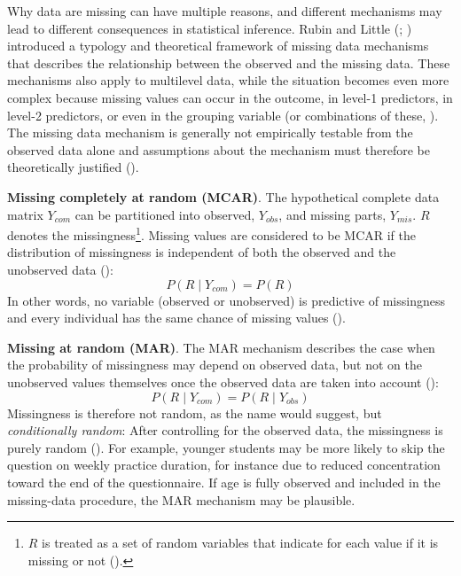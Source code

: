 \documentclass[
  letterpaper,
  11pt,
  english,
  singlespacing,
  headsepline,
  openany]{MastersDoctoralThesis}
\begin{document}
Why data are missing can have multiple reasons, and different mechanisms
may lead to different consequences in statistical inference. Rubin and
Little (;
) introduced a typology and
theoretical framework of missing data mechanisms that describes the
relationship between the observed and the missing data. These mechanisms
also apply to multilevel data, while the situation becomes even more
complex because missing values can occur in the outcome, in level-1
predictors, in level-2 predictors, or even in the grouping variable (or
combinations of these, ). The
missing data mechanism is generally not empirically testable from the
observed data alone and assumptions about the mechanism must therefore
be theoretically justified ().

\textbf{Missing completely at random (MCAR)}. The hypothetical complete
data matrix \(Y_{com}\) can be partitioned into observed, \(Y_{obs}\),
and missing parts, \(Y_{mis}\). \(R\) denotes the
missingness\footnote{\(R\) is treated as a set of random variables that
  indicate for each value if it is missing or not
  ().}. Missing values are
considered to be MCAR if the distribution of missingness is independent
of both the observed and the unobserved data
(): \[
P(R \mid Y_{com}) = P (R)
\] In other words, no variable (observed or unobserved) is predictive of
missingness and every individual has the same chance of missing values
().

\textbf{Missing at random (MAR)}. The MAR mechanism describes the case
when the probability of missingness may depend on observed data, but not
on the unobserved values themselves once the observed data are taken
into account (): \[
P(R \mid Y_{com}) = P (R \mid Y_{obs})
\] Missingness is therefore not random, as the name would suggest, but
\emph{conditionally random}: After controlling for the observed data,
the missingness is purely random (). For example, younger students may be more likely to skip
the question on weekly practice duration, for instance due to reduced
concentration toward the end of the questionnaire. If age is fully
observed and included in the missing-data procedure, the MAR mechanism
may be plausible.
\end{document}
